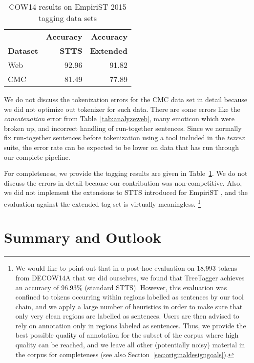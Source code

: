 \documentclass[11pt]{article}
\begin{document}
\begin{table}[!htb]
  \centering
  \begin{tabular}{|l|rr|}
    \hline
                     & \textbf{Accuracy} & \textbf{Accuracy} \\
    \textbf{Dataset} & \textbf{STTS} & \textbf{Extended} \\
    \hline
    Web & 92.96 & 91.82 \\ 
    CMC & 81.49 & 77.89 \\
    \hline
  \end{tabular}
  \caption{COW14 results on EmpiriST 2015 tagging data sets}
  \label{tab:resultstag}
\end{table}

We do not discuss the tokenization errors for the CMC data set in detail because we did not optimize out tokenizer for such data.
There are some errors like the \textit{concatenation} error from Table~\ref{tab:analyzeweb}, many emoticon which were broken up, and incorrect handling of run-together sentences.
Since we normally fix run-together sentences before tokenization using a tool included in the \textit{texrex} suite, the error rate can be expected to be lower on data that has run through our complete pipeline.

For completeness, we provide the tagging results are given in Table~\ref{tab:resultstag}.
We do not discuss the errors in detail because our contribution was non-competitive.
Also, we did not implement the extensions to STTS introduced for EmpiriST \cite{BeisswengerEa2016}, and the evaluation against the extended tag set is virtually meaningless.%
\footnote{
We would like to point out that in a post-hoc evaluation on 18,993 tokens from DECOW14A that we did ourselves, we found that TreeTagger achieves an accuracy of 96.93\% (standard STTS).
However, this evaluation was confined to tokens occurring within regions labelled as sentences by our tool chain, and we apply a large number of heuristics in order to make sure that only very clean regions are labelled as sentences.
Users are then advised to rely on annotation only in regions labeled as sentences.
Thus, we provide the best possible quality of annotation for the subset of the corpus where high quality can be reached, and we leave all other (potentially noisy) material in the corpus for completeness (see also Section~\ref{sec:originaldesigngoals}).
}

\section{Summary and Outlook}
\label{sec:summaryoutlook}
\end{document}
